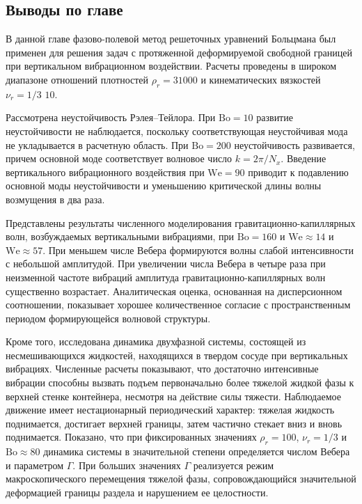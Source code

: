 \documentclass[12pt,a4paper]{article}
\begin{document}
\subsection{Выводы по главе}

В данной главе фазово-полевой метод решеточных уравнений Больцмана был применен для решения задач с протяженной деформируемой свободной границей при вертикальном вибрационном воздействии. Расчеты проведены в широком диапазоне отношений плотностей $\rho_r=3$\textdiv$1000$ и кинематических вязкостей $\nu_r=1/3 $ \textdiv$10$.

Рассмотрена неустойчивость Рэлея--Тейлора. При $\mathrm{Bo}=10$ развитие неустойчивости не наблюдается, поскольку соответствующая неустойчивая мода не укладывается в расчетную область. При $\mathrm{Bo}=200$ неустойчивость развивается, причем основной моде соответствует волновое число $k=2\pi/N_x$. Введение вертикального вибрационного воздействия при $\mathrm{We}=90$ приводит к подавлению основной моды неустойчивости и уменьшению критической длины волны возмущения в два раза.

Представлены результаты численного моделирования гравитационно-капиллярных волн, возбуждаемых вертикальными вибрациями, при $\mathrm{Bo}=160$ и $\mathrm{We}\approx14$ и $\mathrm{We}\approx57$. При меньшем числе Вебера формируются волны слабой интенсивности с небольшой амплитудой. При увеличении числа Вебера в четыре раза при неизменной частоте вибраций амплитуда гравитационно-капиллярных волн существенно возрастает. Аналитическая оценка, основанная на дисперсионном соотношении, показывает хорошее количественное согласие с пространственным периодом формирующейся волновой структуры.

Кроме того, исследована динамика двухфазной системы, состоящей из несмешивающихся жидкостей, находящихся в твердом сосуде при вертикальных вибрациях. Численные расчеты показывают, что достаточно интенсивные вибрации способны вызвать подъем первоначально более тяжелой жидкой фазы к верхней стенке контейнера, несмотря на действие силы тяжести. Наблюдаемое движение имеет нестационарный периодический характер: тяжелая жидкость поднимается, достигает верхней границы, затем частично стекает вниз и вновь поднимается. Показано, что при фиксированных значениях $\rho_r=100$, $\nu_r=1/3$ и $\mathrm{Bo}\approx80$ динамика системы в значительной степени определяется числом Вебера и параметром $\Gamma$. При больших значениях $\Gamma$ реализуется режим макроскопического перемещения тяжелой фазы, сопровождающийся значительной деформацией границы раздела и нарушением ее целостности.
\end{document}

